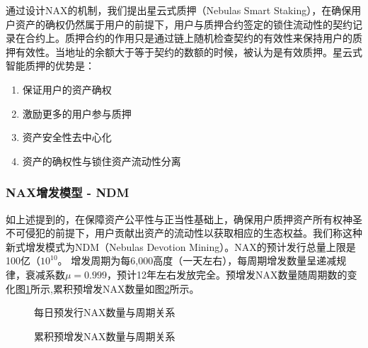 通过设计NAX的机制，我们提出星云式质押（Nebulas Smart Staking），在确保用户资产的确权仍然属于用户的前提下，用户与质押合约签定的锁住流动性的契约记录在合约上。质押合约的作用只是通过链上随机检查契约的有效性来保持用户的质押有效性。当地址的余额大于等于契约的数额的时候，被认为是有效质押。星云式智能质押的优势是：
\begin{enumerate}[\hspace{2cm}(a)]
    \item 保证用户的资产确权
    \item 激励更多的用户参与质押
    \item 资产安全性去中心化
    \item 资产的确权性与锁住资产流动性分离
\end{enumerate}

\subsubsection{NAX增发模型 - NDM}
如上述提到的，在保障资产公平性与正当性基础上，确保用户质押资产所有权神圣不可侵犯的前提下，用户贡献出资产的流动性以获取相应的生态权益。我们称这种新式增发模式为NDM（Nebulas Devotion Mining）。NAX的预计发行总量上限是100亿（\(10^{10}\)。 增发周期为每6,000高度（一天左右），每周期增发数量呈递减规律，衰减系数$\mu=0.999$，预计12年左右发放完全。预增发NAX数量随周期数的变化图\ref{dist}所示,累积预增发NAX数量如图\ref{acc}所示。

\begin{figure}
\centering
    \caption{每日预发行NAX数量与周期关系}\label{dist}
\end{figure}


\begin{figure}
\centering
\caption{累积预增发NAX数量与周期关系}\label{acc}
\end{figure}

